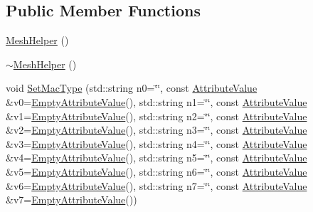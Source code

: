 \subsection*{Public Member Functions}
\begin{DoxyCompactItemize}
\item 
\hyperlink{classns3_1_1MeshHelper_a8e3f98a4dc38a07c31331e96447a12ca}{Mesh\+Helper} ()
\item 
\hyperlink{classns3_1_1MeshHelper_a39a7b123922dfffcb3219365fe8834f0}{$\sim$\+Mesh\+Helper} ()
\item 
void \hyperlink{classns3_1_1MeshHelper_a549d568927a88e95a721f2be58232c10}{Set\+Mac\+Type} (std\+::string n0=\char`\"{}\char`\"{}, const \hyperlink{classns3_1_1AttributeValue}{Attribute\+Value} \&v0=\hyperlink{classns3_1_1EmptyAttributeValue}{Empty\+Attribute\+Value}(), std\+::string n1=\char`\"{}\char`\"{}, const \hyperlink{classns3_1_1AttributeValue}{Attribute\+Value} \&v1=\hyperlink{classns3_1_1EmptyAttributeValue}{Empty\+Attribute\+Value}(), std\+::string n2=\char`\"{}\char`\"{}, const \hyperlink{classns3_1_1AttributeValue}{Attribute\+Value} \&v2=\hyperlink{classns3_1_1EmptyAttributeValue}{Empty\+Attribute\+Value}(), std\+::string n3=\char`\"{}\char`\"{}, const \hyperlink{classns3_1_1AttributeValue}{Attribute\+Value} \&v3=\hyperlink{classns3_1_1EmptyAttributeValue}{Empty\+Attribute\+Value}(), std\+::string n4=\char`\"{}\char`\"{}, const \hyperlink{classns3_1_1AttributeValue}{Attribute\+Value} \&v4=\hyperlink{classns3_1_1EmptyAttributeValue}{Empty\+Attribute\+Value}(), std\+::string n5=\char`\"{}\char`\"{}, const \hyperlink{classns3_1_1AttributeValue}{Attribute\+Value} \&v5=\hyperlink{classns3_1_1EmptyAttributeValue}{Empty\+Attribute\+Value}(), std\+::string n6=\char`\"{}\char`\"{}, const \hyperlink{classns3_1_1AttributeValue}{Attribute\+Value} \&v6=\hyperlink{classns3_1_1EmptyAttributeValue}{Empty\+Attribute\+Value}(), std\+::string n7=\char`\"{}\char`\"{}, const \hyperlink{classns3_1_1AttributeValue}{Attribute\+Value} \&v7=\hyperlink{classns3_1_1EmptyAttributeValue}{Empty\+Attribute\+Value}())
\item 

\end{DoxyCompactItemize}
